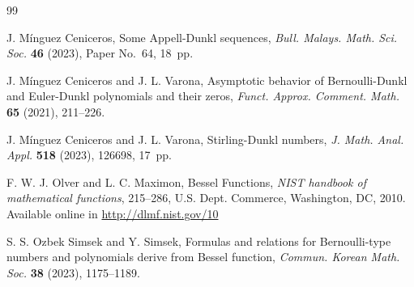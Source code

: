 \documentclass[11pt]{article}
\theoremstyle{plain}
\theoremstyle{remark}
\numberwithin{equation}{section} %
\begin{document}
\begin{thebibliography}{99}


J. M\'inguez Ceniceros,
Some Appell-Dunkl sequences,
\textit{Bull. Malays. Math. Sci. Soc.} 
\textbf{46} (2023), Paper No.~64, 18~pp.

J. M\'inguez Ceniceros and J. L. Varona,
Asymptotic behavior of Bernoulli-Dunkl and Euler-Dunkl polynomials and their zeros,
\textit{Funct. Approx. Comment. Math.} 
\textbf{65} (2021), 211--226.

J. M\'inguez Ceniceros and J. L. Varona,
Stirling-Dunkl numbers,
\textit{J. Math. Anal. Appl.} 
\textbf{518} (2023), 126698, 17~pp.





F. W. J. Olver and L. C. Maximon,
Bessel Functions,
\textit{NIST handbook of mathematical functions},
215--286, %
U.S. Dept. Commerce, Washington, DC, 2010.
Available online in \url{http://dlmf.nist.gov/10}

S. S. Ozbek Simsek and Y. Simsek,
Formulas and relations for Bernoulli-type numbers and polynomials derive from Bessel function,
\textit{Commun. Korean Math. Soc.}
\textbf{38} (2023), 1175--1189. %




\end{thebibliography}
\end{document}
